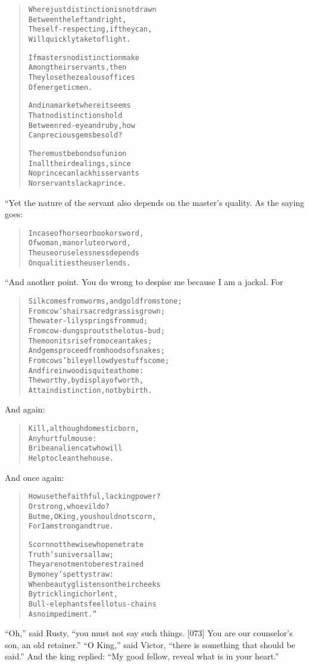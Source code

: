 \documentclass[article, twoside, 14pt]{memoir}
\renewenvironment{verbatim}{%
\begin{quote}%
\vskip -10pt%
\begin{alltt}\normalfont\large}{\end{alltt}%
\end{quote}%
\vskip -10pt
} %
\begin{document}
\begin{verbatim}
Where just distinction is not drawn
    Between the left and right,
The self-respecting, if they can,
    Will quickly take to flight.

If masters no distinction make
    Among their servants, then
They lose the zealous offices
    Of energetic men.

And in a market where it seems
    That no distinctions hold
Between red-eye and ruby, how
    Can precious gems be sold?

There must be bonds of union
    In all their dealings, since
No prince can lack his servants
    Nor servants lack a prince.
\end{verbatim}
“Yet the nature of the servant also depends on the master's
quality. As the saying goes:

\begin{verbatim}
In case of horse or book or sword,
Of woman, man or lute or word,
The use or uselessness depends
On qualities the user lends.
\end{verbatim}
“And another point. You do wrong to despise me because I am a
jackal. For

\begin{verbatim}
Silk comes from worms, and gold from stone;
From cow's hair sacred grass is grown;
The water-lily springs from mud;
From cow-dung sprouts the lotus-bud;
The moon its rise from ocean takes;
And gems proceed from hoods of snakes;
From cows' bile yellow dyestuffs come;
And fire in wood is quite at home:
The worthy, by display of worth,
Attain distinction, not by birth.
\end{verbatim}
And again:

\begin{verbatim}
Kill, although domestic born,
    Any hurtful mouse:
Bribe an alien cat who will
    Help to clean the house.
\end{verbatim}
And once again:

\begin{verbatim}
How use the faithful, lacking power?
    Or strong, who evil do?
But me, O King, you should not scorn,
    For I am strong and true.

Scorn not the wise who penetrate
    Truth's universal law;
They are not men to be restrained
    By money's petty straw:
When beauty glistens on their cheeks
    By trickling ichor lent,
Bull-elephants feel lotus-chains
    As no impediment.”
\end{verbatim}
``Oh,'' said Rusty,
``you must not say such things. [073] You are our counselor's son, an old retainer.''
``O King,'' said Victor,
``there is something that should be said.'' And the king replied:
``My good fellow, reveal what is in your heart.''
\end{document}
